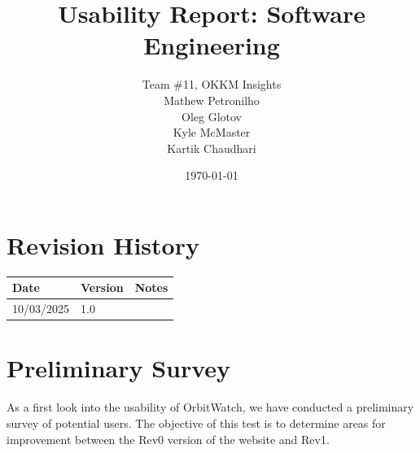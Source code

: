 \documentclass[12pt, titlepage]{article}
\begin{document}
\title{Usability Report: Software Engineering} 
\author{Team \#11, OKKM Insights\\
Mathew Petronilho\\
Oleg Glotov\\
Kyle McMaster\\
Kartik Chaudhari}
\date{\today}
	
\maketitle


\section{Revision History}

\begin{tabularx}{\textwidth}{p{3cm}p{2cm}X}
\toprule {\bf Date} & {\bf Version} & {\bf Notes}\\
\midrule
10/03/2025 & 1.0  &\\
\bottomrule
\end{tabularx}


\tableofcontents

\section{Preliminary Survey}
As a first look into the usability of OrbitWatch, we have conducted a preliminary survey of potential users. The objective of this test is to determine areas for improvement between the Rev0 version of the website and Rev1.
\end{document}
